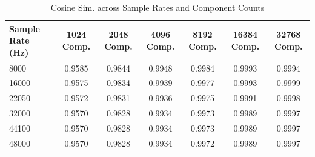 \begin{table}[htbp]
\centering
\caption{Cosine Sim. across Sample Rates and Component Counts}
\begin{tabular}{|l|c|c|c|c|c|c|}
\hline
Sample Rate (Hz) & 1024 Comp. & 2048 Comp. & 4096 Comp. & 8192 Comp. & 16384 Comp. & 32768 Comp. \\ \hline
8000 & 0.9585 & 0.9844 & 0.9948 & 0.9984 & 0.9993 & 0.9994 \\ \hline
16000 & 0.9575 & 0.9834 & 0.9939 & 0.9977 & 0.9993 & 0.9999 \\ \hline
22050 & 0.9572 & 0.9831 & 0.9936 & 0.9975 & 0.9991 & 0.9998 \\ \hline
32000 & 0.9570 & 0.9828 & 0.9934 & 0.9973 & 0.9989 & 0.9997 \\ \hline
44100 & 0.9570 & 0.9828 & 0.9934 & 0.9973 & 0.9989 & 0.9997 \\ \hline
48000 & 0.9570 & 0.9828 & 0.9934 & 0.9972 & 0.9989 & 0.9997 \\ \hline
\end{tabular}
\end{table}
